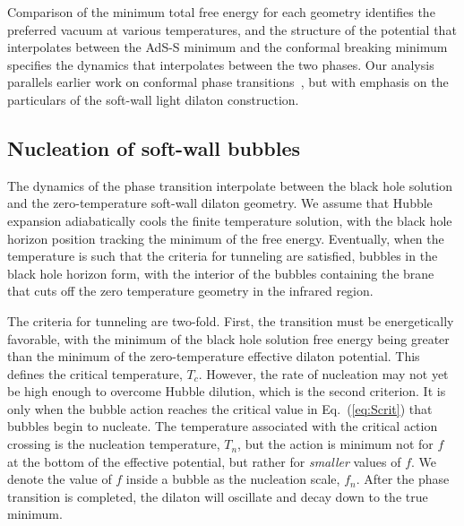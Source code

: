 \documentclass[12pt]{article}
\begin{document}
Comparison of the minimum total free energy for each geometry identifies the preferred vacuum at various temperatures, and the structure of the potential that interpolates between the AdS-S minimum and the conformal breaking minimum specifies the dynamics that interpolates between the two phases.  Our analysis parallels earlier work on conformal phase transitions~\cite{Creminelli:2001th, Randall:2006py}, but with emphasis on the particulars of the soft-wall light dilaton construction. 



\subsection{Nucleation of soft-wall bubbles}

The dynamics of the phase transition interpolate between the black hole solution and the zero-temperature soft-wall dilaton geometry.  We assume that Hubble expansion adiabatically cools the finite temperature solution, with the black hole horizon position tracking the minimum of the free energy.  Eventually, when the temperature is such that the criteria for tunneling are satisfied, bubbles in the black hole horizon form, with the interior of the bubbles containing the brane that cuts off the zero temperature geometry in the infrared region.

The criteria for tunneling are two-fold.  First, the transition must be energetically favorable, with the minimum of the black hole solution free energy being greater than the minimum of the zero-temperature effective dilaton potential.  This defines the critical temperature, $T_c$.  However, the rate of nucleation may not yet be high enough to overcome Hubble dilution, which is the second criterion.  It is only when the bubble action reaches the critical value in Eq.~(\ref{eq:Scrit}) that bubbles begin to nucleate.  The temperature associated with the critical action crossing is the nucleation temperature, $T_n$, but the action is minimum not for $f$ at the bottom of the effective potential, but rather for \emph{smaller} values of $f$.  We denote the value of $f$ inside a bubble as the nucleation scale, $f_n$.  After the phase transition is completed, the dilaton will oscillate and decay down to the true minimum.
\end{document}
